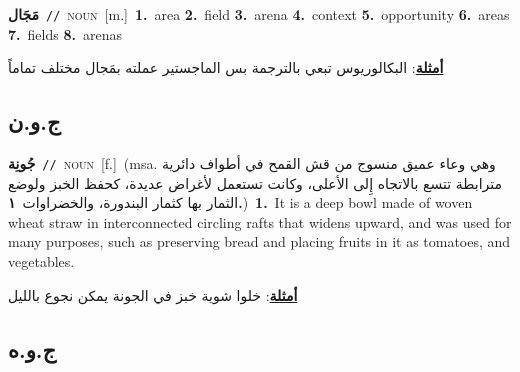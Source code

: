\documentclass[10pt,a4paper,twoside]{article} %
\begin{document}
\begin{multicols}{2}
{\setlength\topsep{0pt}\textbf{\foreignlanguage{arabic}{مَجَال}}\ {\color{gray}\texttt{//}\color{black}}\ \textsc{noun}\ [m.]\ \textbf{1.}~area  \textbf{2.}~field  \textbf{3.}~arena  \textbf{4.}~context  \textbf{5.}~opportunity  \textbf{6.}~areas  \textbf{7.}~fields  \textbf{8.}~arenas\  \begin{flushright}\color{gray}\foreignlanguage{arabic}{\textbf{\underline{\foreignlanguage{arabic}{أمثلة}}}: البكالوريوس تبعي بالترجمة بس الماجستير عملته بمَجال مختلف تماماً}\end{flushright}\color{black}} \vspace{2mm}

\vspace{-3mm}
\subsection*{\color{blue}\foreignlanguage{arabic}{ج.و.ن}\color{blue}{}} 

{\setlength\topsep{0pt}\textbf{\foreignlanguage{arabic}{جُونِة}}\ {\color{gray}\texttt{//}\color{black}}\ \textsc{noun}\ [f.]\ \color{gray}(msa. \foreignlanguage{arabic}{وهي وعاء عميق منسوج من قش القمح في أطواف دائرية مترابطة تتسع بالاتجاه إِلى الأعلى، وكانت تستعمل لأغراض عديدة، كحفظ الخبز ولوضع الثمار بها كثمار البندورة، والخضراوات}~\foreignlanguage{arabic}{\textbf{١.}})\color{black}\ \textbf{1.}~It is a deep bowl made of woven wheat straw in interconnected circling rafts that widens upward, and was used for many purposes, such as preserving bread and placing fruits in it as tomatoes, and vegetables.\  \begin{flushright}\color{gray}\foreignlanguage{arabic}{\textbf{\underline{\foreignlanguage{arabic}{أمثلة}}}: خلوا شوية خبز في الجونة يمكن نجوع بالليل}\end{flushright}\color{black}} \vspace{2mm}

\vspace{-3mm}
\subsection*{\color{blue}\foreignlanguage{arabic}{ج.و.ه}\color{blue}{}} 


\end{multicols}
\end{document}
